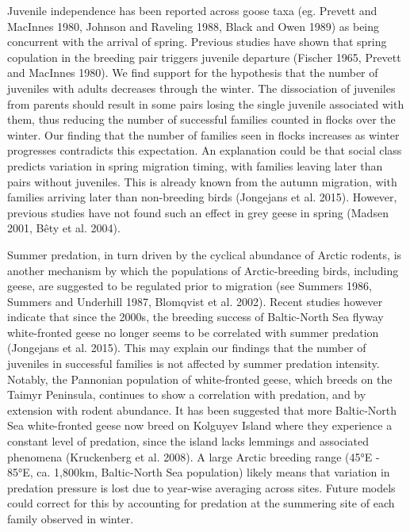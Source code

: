 \documentclass[10pt,twocolumn]{paper}
\begin{document}
Juvenile independence has been reported across goose taxa (eg. Prevett
and MacInnes 1980, Johnson and Raveling 1988, Black and Owen 1989) as
being concurrent with the arrival of spring. Previous studies have shown
that spring copulation in the breeding pair triggers juvenile departure
(Fischer 1965, Prevett and MacInnes 1980). We find support for the
hypothesis that the number of juveniles with adults decreases through
the winter. The dissociation of juveniles from parents should result in
some pairs losing the single juvenile associated with them, thus
reducing the number of successful families counted in flocks over the
winter. Our finding that the number of families seen in flocks increases
as winter progresses contradicts this expectation. An explanation could
be that social class predicts variation in spring migration timing, with
families leaving later than pairs without juveniles. This is already
known from the autumn migration, with families arriving later than
non-breeding birds (Jongejans et al. 2015). However, previous studies
have not found such an effect in grey geese in spring (Madsen 2001, Bêty
et al. 2004).

Summer predation, in turn driven by the cyclical abundance of Arctic
rodents, is another mechanism by which the populations of
Arctic-breeding birds, including geese, are suggested to be regulated
prior to migration (see Summers 1986, Summers and Underhill 1987,
Blomqvist et al. 2002). Recent studies however indicate that since the
2000s, the breeding success of Baltic-North Sea flyway white-fronted
geese no longer seems to be correlated with summer predation (Jongejans
et al. 2015). This may explain our findings that the number of juveniles
in successful families is not affected by summer predation intensity.
Notably, the Pannonian population of white-fronted geese, which breeds
on the Taimyr Peninsula, continues to show a correlation with predation,
and by extension with rodent abundance. It has been suggested that more
Baltic-North Sea white-fronted geese now breed on Kolguyev Island where
they experience a constant level of predation, since the island lacks
lemmings and associated phenomena (Kruckenberg et al. 2008). A large
Arctic breeding range (45°E - 85°E, ca. 1,800km, Baltic-North Sea
population) likely means that variation in predation pressure is lost
due to year-wise averaging across sites. Future models could correct for
this by accounting for predation at the summering site of each family
observed in winter.
\end{document}
